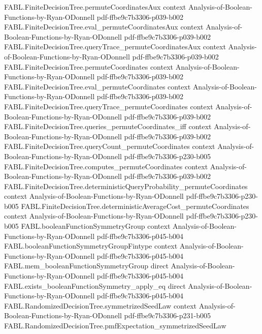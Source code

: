 \begin{theorem}
  {FABL.FiniteDecisionTree.permuteCoordinatesAux}
  {context}
  {Analysis-of-Boolean-Functions-by-Ryan-ODonnell}
  {pdf-ffbe9c7b3306-p039-b002}
\proofstep
  {FABL.FiniteDecisionTree.eval_permuteCoordinatesAux}
  {context}
  {Analysis-of-Boolean-Functions-by-Ryan-ODonnell}
  {pdf-ffbe9c7b3306-p039-b002}
\proofstep
  {FABL.FiniteDecisionTree.queryTrace_permuteCoordinatesAux}
  {context}
  {Analysis-of-Boolean-Functions-by-Ryan-ODonnell}
  {pdf-ffbe9c7b3306-p039-b002}
\proofstep
  {FABL.FiniteDecisionTree.permuteCoordinates}
  {context}
  {Analysis-of-Boolean-Functions-by-Ryan-ODonnell}
  {pdf-ffbe9c7b3306-p039-b002}
\proofstep
  {FABL.FiniteDecisionTree.eval_permuteCoordinates}
  {context}
  {Analysis-of-Boolean-Functions-by-Ryan-ODonnell}
  {pdf-ffbe9c7b3306-p039-b002}
\proofstep
  {FABL.FiniteDecisionTree.queryTrace_permuteCoordinates}
  {context}
  {Analysis-of-Boolean-Functions-by-Ryan-ODonnell}
  {pdf-ffbe9c7b3306-p039-b002}
\proofstep
  {FABL.FiniteDecisionTree.queries_permuteCoordinates_iff}
  {context}
  {Analysis-of-Boolean-Functions-by-Ryan-ODonnell}
  {pdf-ffbe9c7b3306-p039-b002}
\proofstep
  {FABL.FiniteDecisionTree.queryCount_permuteCoordinates}
  {context}
  {Analysis-of-Boolean-Functions-by-Ryan-ODonnell}
  {pdf-ffbe9c7b3306-p230-b005}
\proofstep
  {FABL.FiniteDecisionTree.computes_permuteCoordinates}
  {context}
  {Analysis-of-Boolean-Functions-by-Ryan-ODonnell}
  {pdf-ffbe9c7b3306-p039-b002}
\proofstep
  {FABL.FiniteDecisionTree.deterministicQueryProbability_permuteCoordinates}
  {context}
  {Analysis-of-Boolean-Functions-by-Ryan-ODonnell}
  {pdf-ffbe9c7b3306-p230-b005}
\proofstep
  {FABL.FiniteDecisionTree.deterministicAverageCost_permuteCoordinates}
  {context}
  {Analysis-of-Boolean-Functions-by-Ryan-ODonnell}
  {pdf-ffbe9c7b3306-p230-b005}
\proofstep
  {FABL.booleanFunctionSymmetryGroup}
  {context}
  {Analysis-of-Boolean-Functions-by-Ryan-ODonnell}
  {pdf-ffbe9c7b3306-p045-b004}
\proofstep
  {FABL.booleanFunctionSymmetryGroupFintype}
  {context}
  {Analysis-of-Boolean-Functions-by-Ryan-ODonnell}
  {pdf-ffbe9c7b3306-p045-b004}
\proofstep
  {FABL.mem_booleanFunctionSymmetryGroup}
  {direct}
  {Analysis-of-Boolean-Functions-by-Ryan-ODonnell}
  {pdf-ffbe9c7b3306-p045-b004}
\proofstep
  {FABL.exists_booleanFunctionSymmetry_apply_eq}
  {direct}
  {Analysis-of-Boolean-Functions-by-Ryan-ODonnell}
  {pdf-ffbe9c7b3306-p045-b004}
\proofstep
  {FABL.RandomizedDecisionTree.symmetrizedSeedLaw}
  {context}
  {Analysis-of-Boolean-Functions-by-Ryan-ODonnell}
  {pdf-ffbe9c7b3306-p231-b005}
\proofstep
  {FABL.RandomizedDecisionTree.pmfExpectation_symmetrizedSeedLaw}

\end{theorem}
